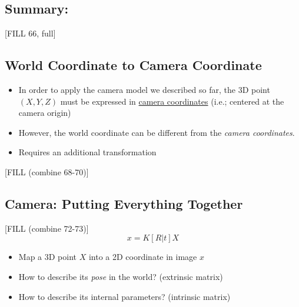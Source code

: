\documentclass[10pt]{article}
\begin{document}
\subsection*{Summary:}
[FILL 66, full]

\subsection*{World Coordinate to Camera Coordinate}
\begin{itemize}
	\item In order to apply the camera model we described so far, the 3D point $(X, Y, Z)$ must be expressed in \underline{camera coordinates} (i.e.; centered at the camera origin)
	\item However, the world coordinate can be different from the \textit{camera coordinates}.
	\item Requires an additional transformation
\end{itemize}
[FILL (combine 68-70)]

\subsection*{Camera: Putting Everything Together}
[FILL (combine 72-73)]
\[x = K[R|t]X\]
\begin{itemize}
	\item Map a 3D point $X$ into a 2D coordinate in image $x$
	\item How to describe its \textit{pose} in the world?  (extrinsic matrix)
	\item How to describe its internal parameters?  (intrinsic matrix)
\end{itemize}
\end{document}

